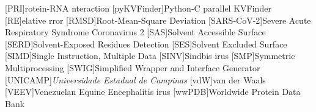 \documentclass[Ingles]{phdthesis}
\begin{document}
\begin{acronym}
  [PRI]{rotein-RNA nteraction}
  [pyKVFinder]{Python-C parallel KVFinder}
  [RE]{elative rror}
  [RMSD]{Root-Mean-Square Deviation}
  [SARS-CoV-2]{Severe Acute Respiratory Syndrome Coronavirus 2}
  [SAS]{Solvent Accessible Surface}
  [SERD]{Solvent-Exposed Residues Detection}
  [SES]{Solvent Excluded Surface}
  [SIMD]{Single Instruction, Multiple Data}
  [SINV]{Sindbis irus}
  [SMP]{Symmetric Multiprocessing}
  [SWIG]{Simplified Wrapper and Interface Generator}
  [UNICAMP]{\textit{Universidade Estadual de Campinas}}
  [vdW]{van der Waals}
  [VEEV]{Venezuelan Equine Encephalitis irus}
  [wwPDB]{Worldwide Protein Data Bank}
\end{acronym}

\clearpage




\clearpage

\tableofcontents
\end{document}
